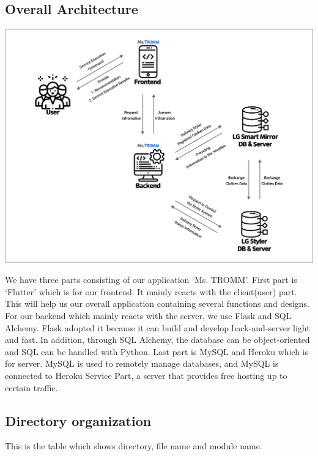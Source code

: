 \documentclass[conference]{IEEEtran}
\begin{document}
\subsection{Overall Architecture}
\centerline{\includegraphics[scale=0.12]{assets/Overall architecture.jpg}}
 We have three parts consisting of our application ‘Ms. TROMM’. First part is ‘Flutter’ which is for our frontend. It mainly reacts with the client(user) part. This will help us our overall application containing several functions and designs. For our backend which mainly reacts with the server, we use Flask and SQL Alchemy. Flask adopted it because it can build and develop back-and-server light and fast. In addition, through SQL Alchemy, the database can be object-oriented and SQL can be handled with Python. Last part is MySQL and Heroku which is for server. MySQL is used to remotely manage databases, and MySQL is connected to Heroku Service Part, a server that provides free hosting up to certain traffic. \\

\break

\subsection{Directory organization}
This is the table which shows directory, file name and module name.\\
\end{document}
